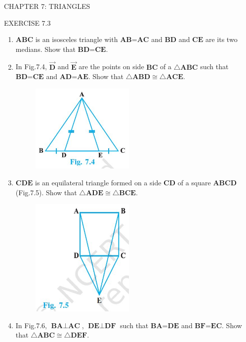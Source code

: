 \documentclass{article}
\begin{document}
\begin{center}
	\color{blue} CHAPTER 7: TRIANGLES
\end{center}
\begin{center}
	\color{blue} EXERCISE 7.3
\end{center}

\begin{enumerate}
	\item $\textbf{ABC}$ is an isosceles triangle with $\textbf{AB=AC}$ and $\textbf{BD}$ and $\textbf{CE}$ are its two medians. Show that $\textbf{BD=CE}$.
	\item In Fig.7.4, $\vec{\textbf{D}}$ and $\vec{\textbf{E}}$ are the points on side $\textbf{BC}$ of a $\triangle \textbf{ABC}$ such that $\textbf{BD=CE}$ and $\textbf{AD=AE}$. Show that $\triangle \textbf{ABD} \cong \triangle \textbf{ACE}$.
\begin{figure}[h]
	\centering
	\includegraphics[width=50mm,scale=0.3]{Figure1}
	\caption{}
	\label{image1}
\end{figure}
\item $\textbf{CDE}$ is an equilateral triangle formed on a side $\textbf{CD}$ of a square $\textbf{ABCD}$ (Fig.7.5). Show that $\triangle \textbf{ADE} \cong \triangle \textbf{BCE}$.
\begin{figure}[h]
	\centering
	\includegraphics[width=50mm,scale=0.3]{Figure2}
	\caption{}
	\label{image2}
\end{figure}
\item In Fig.7.6, $\textbf{BA} \perp \textbf{AC}$, $\textbf{DE} \perp \textbf{DF}$ such that $\textbf{BA=DE}$ and $\textbf{BF=EC}$. Show that $\triangle \textbf{ABC} \cong \triangle \textbf{DEF}$.

\end{enumerate}
\end{document}

